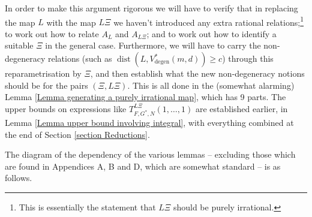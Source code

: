 \documentclass[12pt,a4paper,twoside,reqno]{amsart}
\newcommand{\degen}{\operatorname{degen}}
\newcommand{\dist}{\operatorname{dist}}
\numberwithin{equation}{section}
\begin{document}
In order to make this argument rigorous we will have to verify that in replacing the map $L$ with the map $L\Xi$ we haven't introduced any extra rational relations;\footnote{This is essentially the statement that $L\Xi$ should be purely irrational.} to work out how to relate $A_{L}$ and $A_{L\Xi}$; and to work out how to identify a suitable $\Xi$ in the general case. Furthermore, we will have to carry the non-degeneracy relations (such as $\dist(L,V_{\degen}^*(m,d)) \geqslant c$) through this reparametrisation by $\Xi$, and then establish what the new non-degeneracy notions should be for the pairs $(\Xi,L\Xi)$. This is all done in the (somewhat alarming) Lemma \ref{Lemma generating a purely irrational map}, which has 9 parts. The upper bounds on expressions like $T_{F,G^*,N}^{L\Xi}(1,\dots,1)$ are established earlier, in Lemma \ref{Lemma upper bound involving integral}, with everything combined at the end of Section \ref{section Reductions}. 

 The diagram of the dependency of the various lemmas -- excluding those which are found in Appendices A, B and D, which are somewhat standard -- is as follows. \\
\end{document}
